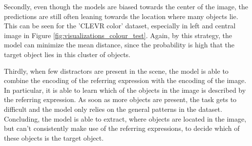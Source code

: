 Secondly, even though the models are biased towards the center of the image, the predictions are still often leaning towards the location where many objects lie.
This can be seen for the 'CLEVR color' dataset, especially in left and central image in Figure \ref{fig:visualizations_colour_test}.
Again, by this strategy, the model can minimize the mean distance, since the probability is high that the target object lies in this cluster of objects.

Thirdly, when few distractors are present in the scene, the model is able to combine the encoding of the referring expression with the encoding of the image.
In particular, it is able to learn which of the objects in the image is described by the referring expression.
As soon as more objects are present, the task gets to difficult and the model only relies on the general patterns in the dataset.
Concluding, the model is able to extract, where objects are located in the image, but can't consistently make use of the referring expressions, to decide which of these objects is the target object.

